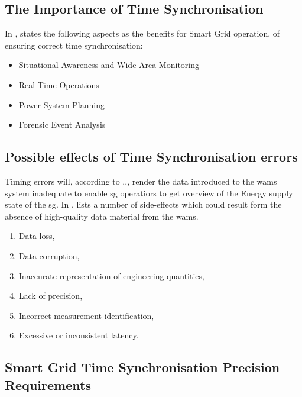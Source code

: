 \subsection{The Importance of Time Synchronisation}

In \cite{dagle2019importance}, \citeauthor{dagle2019importance} states the following aspects as the benefits for Smart Grid operation, of ensuring correct time synchronisation:


\begin{itemize}
    \item  Situational Awareness and Wide-Area Monitoring
    \item  Real-Time Operations
    \item  Power System Planning 
    \item  Forensic Event Analysis
    
\end{itemize}

\subsection{Possible effects of Time Synchronisation errors}
Timing errors will, according to ,,, render the data introduced to the \acrshort{wams} system inadequate to enable \acrshort{sg} operatiors to get overview of the Energy supply state of the \acrshort{sg}.
In \Cite{martin2019impact}, \citeauthor{martin2019impact} lists a number of side-effects which could result form the absence of high-quality data material from the \acrshort{wams}.


\begin{enumerate}




    \item Data loss,
    \item Data corruption,
    \item Inaccurate representation of engineering quantities,
    \item Lack of precision,
    \item Incorrect measurement identification,
    \item Excessive or inconsistent latency.

\end{enumerate}




\subsection[Smart Grid Time Sync Precision Requirements]{Smart Grid Time Synchronisation Precision Requirements}


